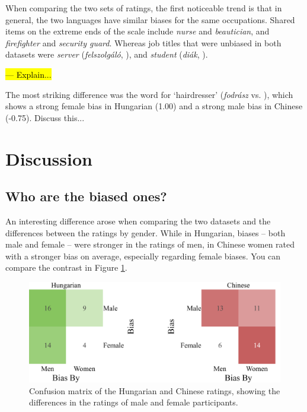 \documentclass[11pt]{article}
\newcommand{\zh}[1]{\simplifiedchinesefont{#1}\rmfamily}
\begin{document}
When comparing the two sets of ratings, the first noticeable trend is that in general, the two languages have similar biases for the same occupations. Shared items on the extreme ends of the scale include \textit{nurse} and \textit{beautician}, and \textit{firefighter} and \textit{security guard}. Whereas job titles that were unbiased in both datasets were \textit{server} (\textit{felszolgáló}, \zh{服务员}), and \textit{student} (\textit{diák}, \zh{学生}).

\hl{--- Explain...}

The most striking difference was the word for `hairdresser' (\textit{fodrász} vs. \zh{理发师}), which shows a strong female bias in Hungarian (1.00) and a strong male bias in Chinese (-0.75). Discuss this...


\section{Discussion}\label{sec:discussion}


\subsection{Who are the biased ones?}

An interesting difference arose when comparing the two datasets and the differences between the ratings by gender. While in Hungarian, biases -- both male and female -- were stronger in the ratings of men, in Chinese women rated with a stronger bias on average, especially regarding female biases. You can compare the contrast in Figure \ref{fig:confusion_matrices}.

\begin{figure}[!ht]
  \centering
  \includegraphics[width=\linewidth]{../confusion_matrices}
  \caption{Confusion matrix of the Hungarian and Chinese ratings, showing the differences in the ratings of male and female participants.}  
  \label{fig:confusion_matrices}
\end{figure}
\end{document}
